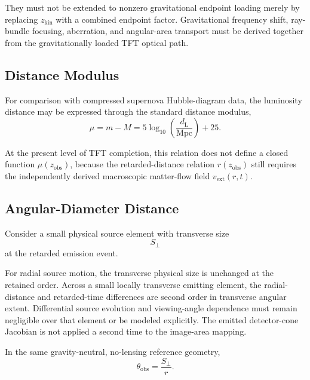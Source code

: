 They must not be extended to nonzero gravitational endpoint loading merely by
replacing \(z_{\mathrm{kin}}\) with a combined endpoint factor. Gravitational
frequency shift, ray-bundle focusing, aberration, and angular-area transport
must be derived together from the gravitationally loaded TFT optical path.

\subsection{Distance Modulus}

For comparison with compressed supernova Hubble-diagram data, the luminosity
distance may be expressed through the standard distance modulus,
\begin{equation}
    \mu
    =
    m-M
    =
    5\log_{10}
    \left(
        \frac{d_{\mathrm L}}{\mathrm{Mpc}}
    \right)
    +25.
\end{equation}

At the present level of TFT completion, this relation does not define a closed
function \(\mu(z_{\mathrm{obs}})\), because the retarded-distance relation
\(r(z_{\mathrm{obs}})\) still requires the independently derived macroscopic
matter-flow field \(v_{\mathrm{ext}}(r,t)\).

\subsection{Angular-Diameter Distance}

Consider a small physical source element with transverse size
\begin{equation}
    S_\perp
\end{equation}
at the retarded emission event.

For radial source motion, the transverse physical size is unchanged at the
retained order. Across a small locally transverse emitting element, the
radial-distance and retarded-time differences are second order in transverse
angular extent. Differential source evolution and viewing-angle dependence
must remain negligible over that element or be modeled explicitly. The
emitted detector-cone Jacobian is not applied a second time to the image-area
mapping.

In the same gravity-neutral, no-lensing reference geometry,
\begin{equation}
    \theta_{\mathrm{obs}}
    =
    \frac{
        S_\perp
    }{
        r
    }.
\end{equation}

